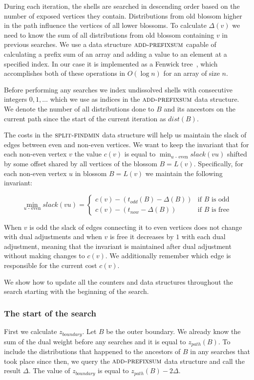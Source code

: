 During each iteration, the shells are searched in descending order based on the number of exposed vertices they contain. Distributions from old blossom higher in the path influence the vertices of all lower blossoms. To calculate $\Delta(v)$ we need to know the sum of all distributions from old blossom containing $v$ in previous searches. We use a data structure $\textsc{add-prefixsum}$ capable of calculating a prefix sum of an array and adding a value to an element at a specified index. In our case it is implemented as a Fenwick tree~\cite{Fenwick1994AND}, which accomplishes both of these operations in $O(\log n)$ for an array of size $n$. 

Before performing any searches we index undissolved shells with consecutive integers $0, 1, \dots$ which we use as indices in the $\textsc{add-prefixsum}$ data structure. We denote the number of all distributions done to $B$ and its ancestors on the current path since the start of the current iteration as $dist(B)$.

The costs in the $\textsc{split-findmin}$ data structure will help us maintain the slack of edges between even and non-even vertices. We want to keep the invariant that for each non-even vertex $v$ the value $c(v)$ is equal to $\min_{u\text{ - even}} slack(vu)$ shifted by some offset shared by all vertices of the blossom $B = L(v)$. Specifically, for each non-even vertex $u$ in blossom $B = L(v)$ we maintain the following invariant:

\[ 
\min_{u \text{ - even}} slack(vu) = \begin{cases}
    c(v) - (t_{odd}(B) - \Delta(B)) & \text{if $B$ is odd} \\
    c(v) - (t_{now} - \Delta(B)) & \text{if $B$ is free}
\end{cases}
\]

When $v$ is odd the slack of edges connecting it to even vertices does not change with dual adjustments and when $v$ is free it decreases by $1$ with each dual adjustment, meaning that the invariant is maintained after dual adjustment without making changes to $c(v)$. We additionally remember which edge is responsible for the current cost $c(v)$.

We show how to update all the counters and data structures throughout the search starting with the beginning of the search. 

\subsubsection*{The start of the search}
First we calculate $z_{boundary}$. Let $B$ be the outer boundary. We already know the sum of the dual weight before any searches and it is equal to $z_{path}(B)$. To include the distributions that happened to the ancestors of $B$ in any searches that took place since then, we query the $\textsc{add-prefixsum}$ data structure and call the result $\Delta$. The value of $z_{boundary}$ is equal to $z_{path}(B) - 2\Delta$. 

